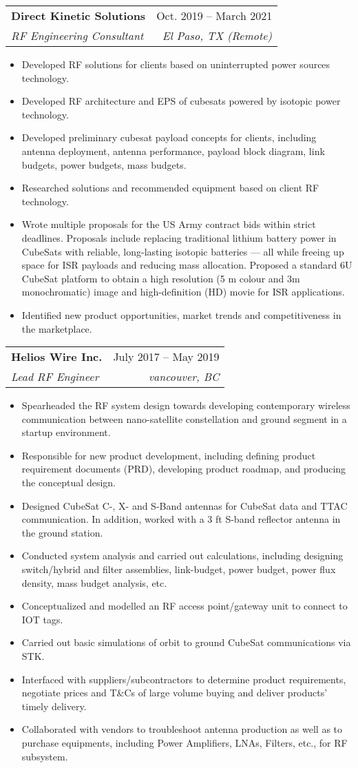 \documentclass[letterpaper,11pt]{article}
\makeatletter
\newcommand{\resumeItem}[1]{
  \item\small{
    {#1 \vspace{-2pt}}
  }
}
\newcommand{\resumeSubheading}[4]{
  \vspace{-2pt}\item
    \begin{tabular*}{0.97\textwidth}[t]{l@{\extracolsep{\fill}}r}
      \textbf{#1} & #2 \\
      \textit{\small#3} & \textit{\small #4} \\
    \end{tabular*}\vspace{-7pt}
}
\newcommand{\resumeItemListStart}{\begin{itemize}}
\newcommand{\resumeItemListEnd}{\end{itemize}\vspace{-5pt}}
\makeatother
\begin{document}
    \resumeSubheading
      {Direct Kinetic Solutions}{Oct. 2019 -- March 2021}
      {RF Engineering Consultant}{El Paso, TX (Remote)}
      \resumeItemListStart
        \resumeItem{Developed RF solutions for clients based on uninterrupted power sources technology.}
        \resumeItem{Developed RF architecture and EPS of cubesats powered by isotopic power technology.}
        \resumeItem{Developed preliminary cubesat payload concepts for clients, including antenna deployment, antenna performance, payload block diagram, link budgets, power budgets, mass budgets.}
        \resumeItem{Researched solutions and recommended equipment based on client RF technology.}
        \resumeItem{Wrote multiple proposals for the  US Army contract bids within strict deadlines. Proposals include replacing traditional lithium battery power in CubeSats with reliable, long-lasting isotopic batteries — all while freeing up space for ISR payloads and reducing mass allocation. Proposed a standard 6U CubeSat platform to obtain a high resolution (5 m colour and 3m monochromatic) image and high-definition (HD) movie for ISR applications.}
        \resumeItem{Identified new product opportunities, market trends and competitiveness in the marketplace.}
    \resumeItemListEnd

    \resumeSubheading
      {Helios Wire Inc.}{July 2017 -- May 2019}
      {Lead RF Engineer}{vancouver, BC}
      \resumeItemListStart
        \resumeItem{Spearheaded the RF system design towards developing contemporary wireless communication between nano-satellite constellation and ground segment in a startup environment.}
        \resumeItem{Responsible for new product development, including defining product requirement documents (PRD), developing product roadmap, and producing the conceptual design.}
        \resumeItem{Designed CubeSat C-, X- and S-Band antennas for CubeSat data and TTAC communication. In addition, worked with a 3 ft S-band reflector antenna in the ground station.}
        \resumeItem{Conducted system analysis and carried out calculations, including designing switch/hybrid and filter assemblies, link-budget, power budget, power flux density, mass budget analysis, etc.}
        \resumeItem{Conceptualized and modelled an RF access point/gateway unit to connect to IOT tags.}
        \resumeItem{Carried out basic simulations of orbit to ground CubeSat communications via STK.}
        \resumeItem{Interfaced with suppliers/subcontractors to determine product requirements, negotiate prices and T\&Cs of large volume buying and deliver products' timely delivery.}
        \resumeItem{Collaborated with vendors to troubleshoot antenna production as well as to purchase equipments, including Power Amplifiers, LNAs, Filters, etc., for RF subsystem.}
      \resumeItemListEnd
\end{document}
